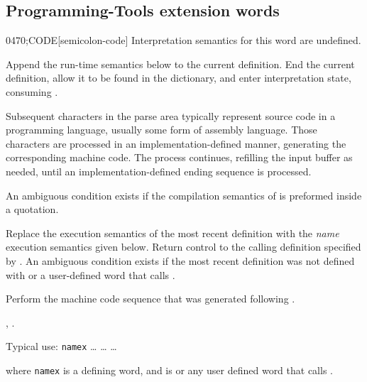 \subsection{Programming-Tools extension words} %
\extended

\begin{worddef}{0470}{;CODE}[semicolon-code]
\interpret
	Interpretation semantics for this word are undefined.

\compile

	Append the run-time semantics below to the current definition.
	End the current definition, allow it to be found in the
	dictionary, and enter interpretation state, consuming
	.

	Subsequent characters in the parse area typically represent
	source code in a programming language, usually some form of
	assembly language. Those characters are processed in an
	implementation-defined manner, generating the corresponding
	machine code. The process continues, refilling the input buffer
	as needed, until an implementation-defined ending sequence is
	processed.

	An ambiguous condition exists if the compilation semantics of
	 is preformed inside a quotation.

\runtime
	\stack{}{}

	Replace the execution semantics of the most recent definition
	with the \emph{name} execution semantics given below. Return
	control to the calling definition specified by .
	An ambiguous condition exists if the most recent definition was
	not defined with  or a user-defined word that
	calls .

\execute[name]

	Perform the machine code sequence that was generated following
	.

\see {},
	.

	\begin{rationale} %
		Typical use:
		\word[core]{:} \texttt{namex}
			{\ldots}  {\ldots}
		 {\ldots}

		where \texttt{namex} is a defining word, and  is
		 or any user defined word that calls
		.
	\end{rationale}
\end{worddef}

